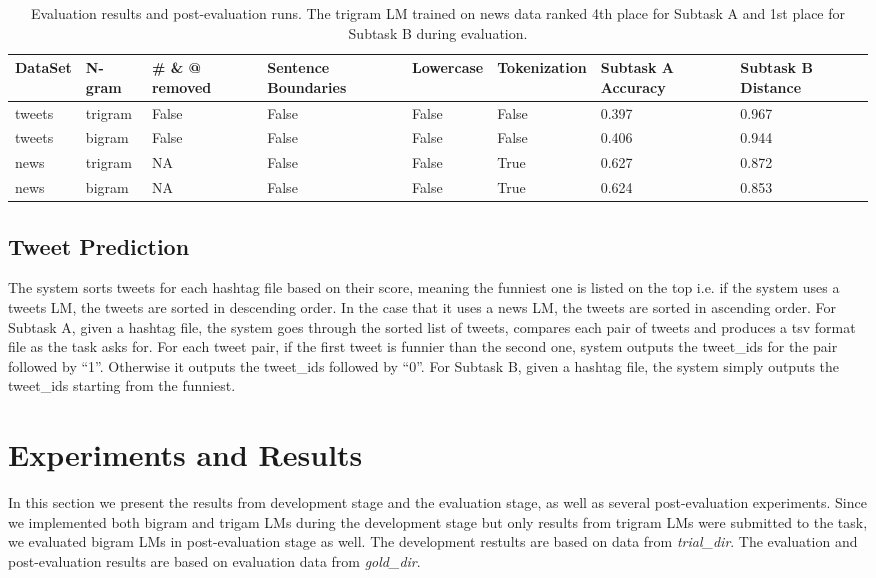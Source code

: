 \documentclass[11pt,a4paper]{article}
\begin{document}
\begin{table*}[h!]
\centering
\begin{tabular}{ |p{1.2cm}|p{1.2cm}|p{1.2cm}|p{1.7cm}|p{1.5cm}|p{1.9cm}|p{1.7cm}|p{1.7cm}|}
\hline
DataSet & N-gram & \# \& @ removed  & Sentence Boundaries & Lowercase & Tokenization & Subtask A Accuracy & Subtask B Distance \\
\hline
tweets & trigram & False & False & False & False & 0.397 & 0.967 \\
\hline
tweets & bigram & False & False & False & False & 0.406 & 0.944 \\
\hline
news & trigram & NA & False & False & True & 0.627 & 0.872 \\
\hline
news & bigram & NA & False & False & True & 0.624 & 0.853 \\
\hline
\end{tabular}
\caption{Evaluation results and post-evaluation runs. The trigram LM trained on news data ranked 4th place for Subtask A and 1st place for Subtask B during evaluation.}
\label{table:4}
\end{table*}



\subsection{Tweet Prediction}
The system sorts tweets for each hashtag file based on their score, meaning the funniest one is listed on the top i.e. if the system uses a tweets LM, the tweets are sorted in descending order. In the case that it uses a news LM, the tweets are sorted in ascending order. For Subtask A, given a hashtag file, the system goes through the sorted list of tweets, compares each pair of tweets and produces a tsv format file as the task asks for. For each tweet pair, if the first tweet is funnier than the second one, system outputs the tweet\_ids for the pair followed by ``1''. Otherwise it outputs the tweet\_ids followed by ``0''. For Subtask B, given a hashtag file, the system simply outputs the tweet\_ids starting from the funniest.


\section{Experiments and Results}
In this section we present the results from development stage and the evaluation stage, as well as several post-evaluation experiments. Since we implemented both bigram and trigam LMs during the development stage but only results from trigram LMs were submitted to the task, we evaluated bigram LMs in post-evaluation stage as well. The development restults are based on data from \textit{trial\_dir}. The evaluation and post-evaluation results are based on evaluation data from \textit{gold\_dir}.
\end{document}
